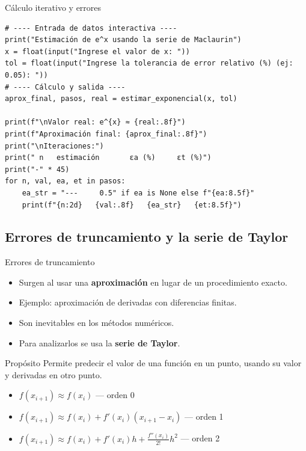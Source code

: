 \documentclass[main.tex]{subfiles}
\begin{document}
\begin{frame}[fragile]{Cálculo iterativo y errores}
\begin{lstlisting}[style=mypython]
# ---- Entrada de datos interactiva ----
print("Estimación de e^x usando la serie de Maclaurin")
x = float(input("Ingrese el valor de x: "))
tol = float(input("Ingrese la tolerancia de error relativo (%) (ej: 0.05): "))
# ---- Cálculo y salida ----
aprox_final, pasos, real = estimar_exponencial(x, tol)

print(f"\nValor real: e^{x} ≈ {real:.8f}")
print(f"Aproximación final: {aprox_final:.8f}")
print("\nIteraciones:")
print(" n   estimación       εa (%)     εt (%)")
print("-" * 45)
for n, val, ea, et in pasos:
    ea_str = "---     0.5" if ea is None else f"{ea:8.5f}"
    print(f"{n:2d}   {val:.8f}   {ea_str}   {et:8.5f}")

\end{lstlisting}
\end{frame}


\subsection{Errores de truncamiento y la serie de Taylor}

\begin{frame}{Errores de truncamiento}
\begin{itemize}
  \item Surgen al usar una \textbf{aproximación} en lugar de un procedimiento exacto.
  \item Ejemplo: aproximación de derivadas con diferencias finitas.
  \item Son inevitables en los métodos numéricos.
  \item Para analizarlos se usa la \textbf{serie de Taylor}.
\end{itemize}

\begin{block}{Propósito}
Permite predecir el valor de una función en un punto, usando su valor y derivadas en otro punto.
\end{block}
\begin{itemize}
  \item \( f(x_{i+1}) \approx f(x_i) \) — orden 0
  \item \( f(x_{i+1}) \approx f(x_i) + f'(x_i)(x_{i+1} - x_i) \) — orden 1
  \item \( f(x_{i+1}) \approx f(x_i) + f'(x_i)h + \frac{f''(x_i)}{2!}h^2 \) — orden 2
\end{itemize}
\end{frame}
\end{document}
